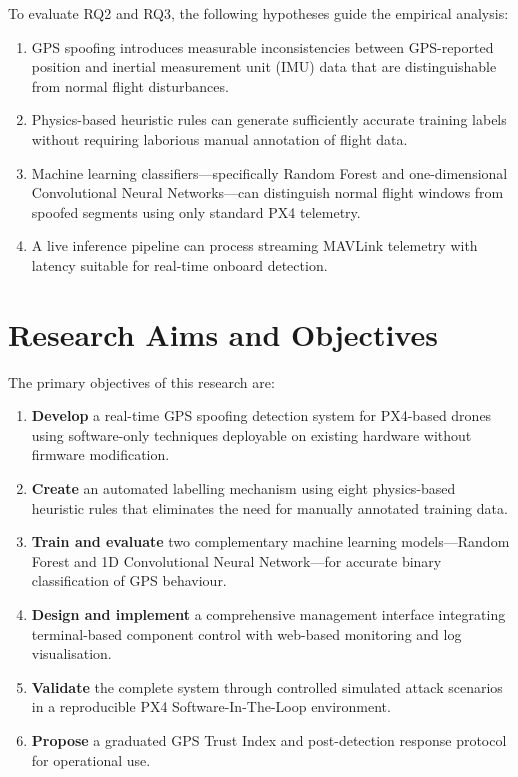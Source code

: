 To evaluate RQ2 and RQ3, the following hypotheses guide the empirical analysis:

\begin{enumerate}[label=H\arabic*:,leftmargin=2em]
    \item GPS spoofing introduces measurable inconsistencies between GPS-reported position and inertial measurement unit (IMU) data that are distinguishable from normal flight disturbances.
    \item Physics-based heuristic rules can generate sufficiently accurate training labels without requiring laborious manual annotation of flight data.
    \item Machine learning classifiers---specifically Random Forest and one-dimensional Convolutional Neural Networks---can distinguish normal flight windows from spoofed segments using only standard PX4 telemetry.
    \item A live inference pipeline can process streaming MAVLink telemetry with latency suitable for real-time onboard detection.
\end{enumerate}

\section{Research Aims and Objectives}

The primary objectives of this research are:

\begin{enumerate}
    \item \textbf{Develop} a real-time GPS spoofing detection system for PX4-based drones using software-only techniques deployable on existing hardware without firmware modification.
    \item \textbf{Create} an automated labelling mechanism using eight physics-based heuristic rules that eliminates the need for manually annotated training data.
    \item \textbf{Train and evaluate} two complementary machine learning models---Random Forest and 1D Convolutional Neural Network---for accurate binary classification of GPS behaviour.
    \item \textbf{Design and implement} a comprehensive management interface integrating terminal-based component control with web-based monitoring and log visualisation.
    \item \textbf{Validate} the complete system through controlled simulated attack scenarios in a reproducible PX4 Software-In-The-Loop environment.
    \item \textbf{Propose} a graduated GPS Trust Index and post-detection response protocol for operational use.
\end{enumerate}

